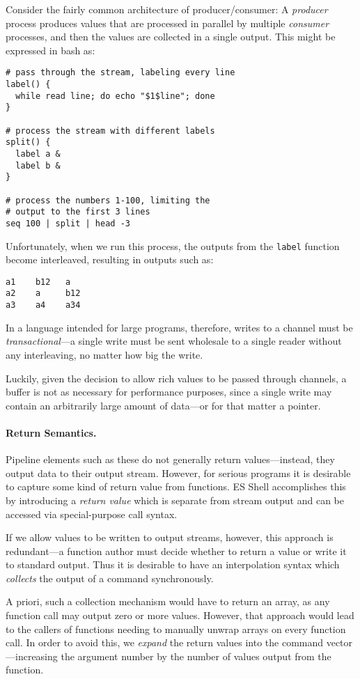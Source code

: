 \documentclass[english,preprint,JIP]{ipsj}
\begin{document}
Consider the fairly common architecture of producer/consumer: A \emph{producer} process produces values that are processed in parallel by multiple \emph{consumer} processes, and then the values are collected in a single output. This might be expressed in bash as:
\begin{lstlisting}
# pass through the stream, labeling every line
label() {
  while read line; do echo "$1$line"; done
}

# process the stream with different labels
split() {
  label a &
  label b &
}

# process the numbers 1-100, limiting the
# output to the first 3 lines
seq 100 | split | head -3
\end{lstlisting}

Unfortunately, when we run this process, the outputs from the \verb/label/ function become interleaved, resulting in outputs such as:

\begin{verbatim}
a1    b12   a
a2    a     b12
a3    a4    a34
\end{verbatim}
In a language intended for large programs, therefore, writes to a channel must be \emph{transactional}---a single write must be sent wholesale to a single reader without any interleaving, no matter how big the write.

Luckily, given the decision to allow rich values to be passed through channels, a buffer is not as necessary for performance purposes, since a single write may contain an arbitrarily large amount of data---or for that matter a pointer.

\paragraph{Return Semantics.}
Pipeline elements such as these do not generally return values---instead, they output data to their output stream. However, for serious programs it is desirable to capture some kind of return value from functions. ES Shell \cite{haahr} accomplishes this by introducing a \emph{return value} which is separate from stream output and can be accessed via special-purpose call syntax.

If we allow values to be written to output streams, however, this approach is redundant---a function author must decide whether to return a value or write it to standard output. Thus it is desirable to have an interpolation syntax which \emph{collects} the output of a command synchronously.

A priori, such a collection mechanism would have to return an array, as any function call may output zero or more values. However, that approach would lead to the callers of functions needing to manually unwrap arrays on every function call. In order to avoid this, we \emph{expand} the return values into the command vector---increasing the argument number by the number of values output from the function.
\end{document}
